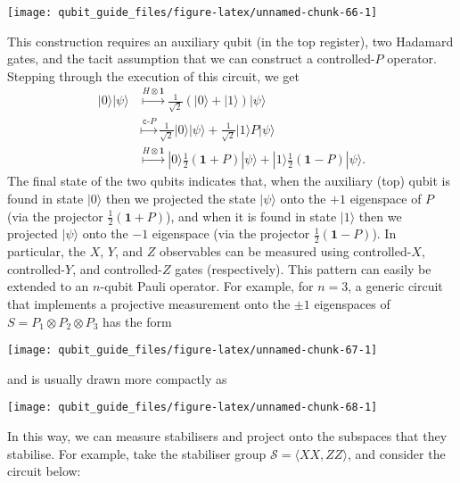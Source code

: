 \documentclass[fleqn]{article}
\begin{document}
\begin{center}\texttt{[image: qubit\_guide\_files/figure-latex/unnamed-chunk-66-1]} \end{center}

This construction requires an auxiliary qubit (in the top register), two Hadamard gates, and the tacit assumption that we can construct a controlled-\(P\) operator.
Stepping through the execution of this circuit, we get
\[
  \begin{aligned}
    |0\rangle|\psi\rangle
    &\overset{H\otimes\mathbf{1}}{\longmapsto}
      \frac{1}{\sqrt{2}}(|0\rangle+|1\rangle)|\psi\rangle
  \\&\overset{\texttt{c-}P}{\longmapsto}
      \frac{1}{\sqrt{2}}|0\rangle|\psi\rangle + \frac{1}{\sqrt{2}}|1\rangle P|\psi\rangle
  \\&\overset{H\otimes\mathbf{1}}{\longmapsto}
      |0\rangle\frac{1}{2}(\mathbf{1}+P)|\psi\rangle + |1\rangle\frac{1}{2}(\mathbf{1}-P)|\psi\rangle.
  \end{aligned}
\]
The final state of the two qubits indicates that, when the auxiliary (top) qubit is found in state \(|0\rangle\) then we projected the state \(|\psi\rangle\) onto the \(+1\) eigenspace of \(P\) (via the projector \(\frac{1}{2}(\mathbf{1}+P)\)), and when it is found in state \(|1\rangle\) then we projected \(|\psi\rangle\) onto the \(-1\) eigenspace (via the projector \(\frac{1}{2}(\mathbf{1}-P)\)).
In particular, the \(X\), \(Y\), and \(Z\) observables can be measured using controlled-\(X\), controlled-\(Y\), and controlled-\(Z\) gates (respectively).
This pattern can easily be extended to an \(n\)-qubit Pauli operator.
For example, for \(n=3\), a generic circuit that implements a projective measurement onto the \(\pm1\) eigenspaces of \(S=P_1\otimes P_2\otimes P_3\) has the form

\begin{center}\texttt{[image: qubit\_guide\_files/figure-latex/unnamed-chunk-67-1]} \end{center}

and is usually drawn more compactly as

\begin{center}\texttt{[image: qubit\_guide\_files/figure-latex/unnamed-chunk-68-1]} \end{center}

In this way, we can measure stabilisers and project onto the subspaces that they stabilise.
For example, take the stabiliser group \(\mathcal{S}=\langle XX,ZZ\rangle\), and consider the circuit below:
\end{document}
